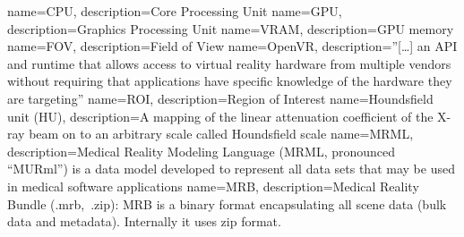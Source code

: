 \makeglossaries

{
	name=CPU,
	description={Core Processing Unit}
}
{
	name=GPU,
	description={Graphics Processing Unit}
}
{
	name=VRAM,
	description={GPU memory}
}
{
	name=FOV,
	description={Field of View}
}
{
name=OpenVR,
description={''[\ldots] an API and runtime that allows access to virtual reality hardware from multiple vendors without requiring that applications have specific knowledge of the hardware they are targeting''\cite{valvesoftwareOpenVRSDK2024}}
}
{
	name=ROI,
	description={Region of Interest}
}
{
	name=Houndsfield unit (HU),
	description={A mapping of the linear attenuation coefficient of the X-ray beam on to an arbitrary scale called Houndsfield scale\cite{denotterHounsfieldUnit2024}}
}
{
	name=MRML,
	description={Medical Reality Modeling Language (MRML, pronounced “MURml”) is a data model developed to represent all data sets that may be used in medical software applications\cite{kikinis3DSlicerPlatform2014}}
}
{
	name=MRB,
	description={Medical Reality Bundle (.mrb,\ .zip): MRB is a binary format encapsulating all scene data (bulk data and metadata). Internally it uses zip format. \cite{kikinis3DSlicerPlatform2014}}
}
